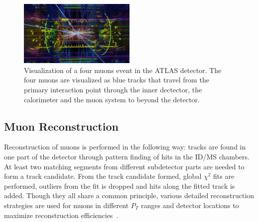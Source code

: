 \begin{figure}[!htb]
    \begin{center}
        \includegraphics[width=0.5\textwidth]{figures/common_ana/Muon}
        \caption{        
            Visualization of a four muons event in the ATLAS detector\cite{ATLAS:1697053}. The four muons are visualized as blue tracks that travel from the primary interaction point through the inner dectector, the calorimeter and the muon system to beyond the detector.
        }
        \label{fig:muon}
    \end{center}
\end{figure}

\subsection{Muon Reconstruction}
Reconstruction of muons is performed in the following way: tracks are found in one part of the detector through pattern finding of hits in the ID/MS chambers. At least two matching segments from different subdetector parts are needed to form a track candidate. From the track candidate formed, global $\chi^{2}$ fits are performed, outliers from the fit is dropped and hits along the fitted track is added. Though they all share a common principle, various detailed reconstruction strategies are used for muons in
different $P_{T}$ ranges and detector locations to maximize reconstruction efficiencies~\cite{muonReco2016}.

